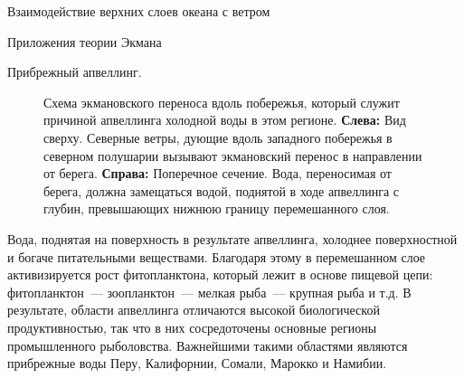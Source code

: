 \begin{chapter}{Взаимодействие верхних слоев океана с ветром}
\begin{section}{Приложения теории Экмана}
\begin{paragraph}{Прибрежный апвеллинг.}
\begin{figure}[t!]
\caption{Схема экмановского переноса вдоль побережья, который служит причиной
апвеллинга холодной воды в этом регионе. 
\textbf{Слева:} Вид сверху. Северные ветры, дующие вдоль западного побережья 
в северном полушарии вызывают экмановский перенос в направлении от берега.
\textbf{Справа:} Поперечное сечение. Вода, переносимая от берега, должна
замещаться водой, поднятой в ходе апвеллинга с глубин, превышающих нижнюю
границу перемешанного слоя.}
\label{fig:upwelling}
\end{figure}
%

Вода, поднятая на поверхность в результате апвеллинга, холоднее поверхностной
и богаче питательными веществами. Благодаря этому в перемешанном 
слое активизируется рост фитопланктона, 
который лежит в основе пищевой цепи: фитопланктон~--- зоопланктон~--- 
мелкая рыба~--- крупная рыба и т.д. В результате, области 
апвеллинга отличаются высокой биологической
продуктивностью, так что в них сосредоточены основные регионы промышленного 
рыболовства. Важнейшими такими областями являются прибрежные воды Перу, 
Калифорнии, Сомали, Марокко и Намибии.
%


\end{paragraph}
\end{section}
\end{chapter}
